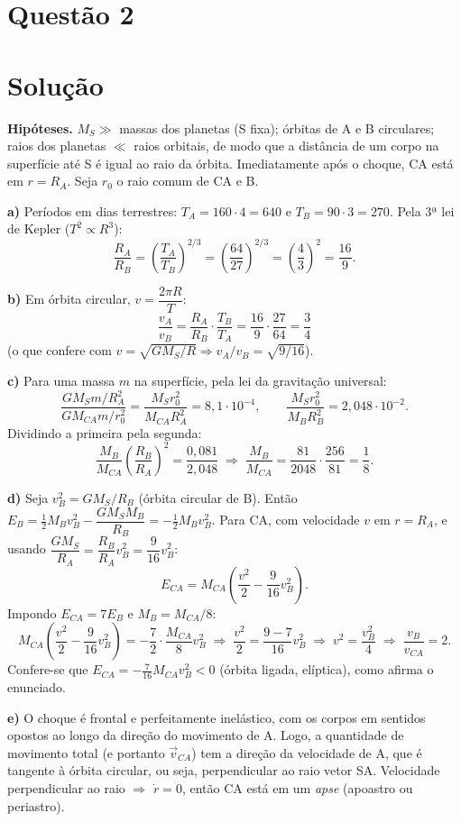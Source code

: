 \documentclass{article}%
\begin{document}
\section*{Questão 2}

\section*{Solução}

\textbf{Hipóteses.} $M_S \gg$ massas dos planetas (S fixa); órbitas de A e B circulares; raios dos planetas $\ll$ raios orbitais, de modo que a distância de um corpo na superfície até S é igual ao raio da órbita. Imediatamente após o choque, CA está em $r=R_A$. Seja $r_0$ o raio comum de CA e B.

\textbf{a)} Períodos em dias terrestres: $T_A=160\cdot 4=640$ e $T_B=90\cdot 3=270$. Pela 3ª lei de Kepler ($T^2\propto R^3$):
\[
\frac{R_A}{R_B}=\left(\frac{T_A}{T_B}\right)^{2/3}=\left(\frac{64}{27}\right)^{2/3}=\left(\frac{4}{3}\right)^2=\frac{16}{9}.
\]

\textbf{b)} Em órbita circular, $v=\dfrac{2\pi R}{T}$:
\[
\frac{v_A}{v_B}=\frac{R_A}{R_B}\cdot\frac{T_B}{T_A}=\frac{16}{9}\cdot\frac{27}{64}=\frac{3}{4}
\]
(o que confere com $v=\sqrt{GM_S/R}\Rightarrow v_A/v_B=\sqrt{9/16}$).

\textbf{c)} Para uma massa $m$ na superfície, pela lei da gravitação universal:
\[
\frac{GM_Sm/R_A^2}{GM_{CA}m/r_0^2}=\frac{M_S r_0^2}{M_{CA}R_A^2}=8{,}1\cdot 10^{-4},\qquad
\frac{M_S r_0^2}{M_B R_B^2}=2{,}048\cdot 10^{-2}.
\]
Dividindo a primeira pela segunda:
\[
\frac{M_B}{M_{CA}}\left(\frac{R_B}{R_A}\right)^2=\frac{0{,}081}{2{,}048}
\;\Rightarrow\;
\frac{M_B}{M_{CA}}=\frac{81}{2048}\cdot\frac{256}{81}=\frac{1}{8}.
\]

\textbf{d)} Seja $v_B^2=GM_S/R_B$ (órbita circular de B). Então $E_B=\tfrac12M_Bv_B^2-\dfrac{GM_SM_B}{R_B}=-\tfrac12M_Bv_B^2$. Para CA, com velocidade $v$ em $r=R_A$, e usando $\dfrac{GM_S}{R_A}=\dfrac{R_B}{R_A}v_B^2=\dfrac{9}{16}v_B^2$:
\[
E_{CA}=M_{CA}\left(\frac{v^2}{2}-\frac{9}{16}v_B^2\right).
\]
Impondo $E_{CA}=7E_B$ e $M_B=M_{CA}/8$:
\[
M_{CA}\left(\frac{v^2}{2}-\frac{9}{16}v_B^2\right)=-\frac{7}{2}\cdot\frac{M_{CA}}{8}v_B^2
\;\Rightarrow\;
\frac{v^2}{2}=\frac{9-7}{16}v_B^2
\;\Rightarrow\; v^2=\frac{v_B^2}{4}
\;\Rightarrow\;
\frac{v_B}{v_{CA}}=2.
\]
Confere-se que $E_{CA}=-\tfrac{7}{16}M_{CA}v_B^2<0$ (órbita ligada, elíptica), como afirma o enunciado.

\textbf{e)} O choque é frontal e perfeitamente inelástico, com os corpos em sentidos opostos ao longo da direção do movimento de A. Logo, a quantidade de movimento total (e portanto $\vec v_{CA}$) tem a direção da velocidade de A, que é tangente à órbita circular, ou seja, perpendicular ao raio vetor SA. Velocidade perpendicular ao raio $\Rightarrow$ $\dot r=0$, então CA está em um \emph{apse} (apoastro ou periastro).
\end{document}
